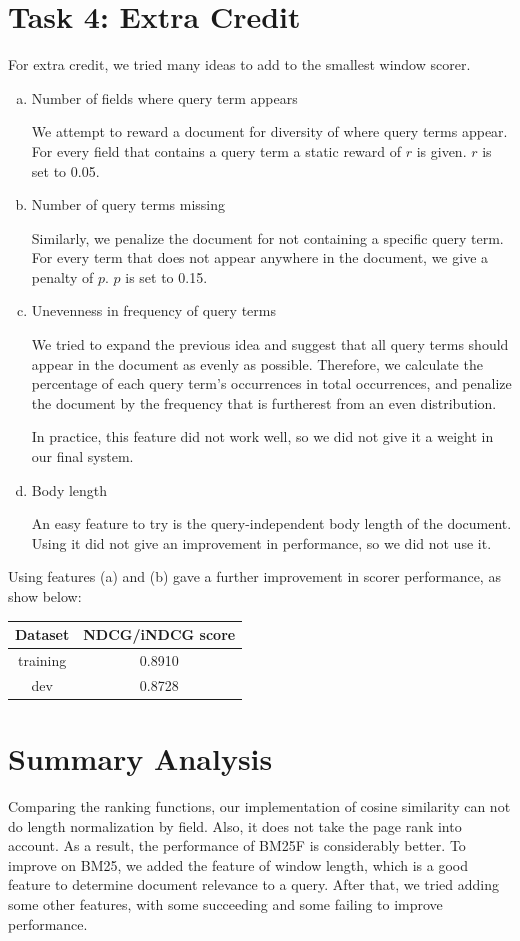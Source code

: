 \documentclass[10pt,twocolumn]{article}
\begin{document}
\section*{Task 4: Extra Credit}
For extra credit, we tried many ideas to add to the smallest window scorer.
\begin{enumerate}[(a)]
\item Number of fields where query term appears

We attempt to reward a document for diversity of where query terms appear. For every field that contains a query term a static reward of $r$ is given. $r$ is set to 0.05.
\item Number of query terms missing

Similarly, we penalize the document for not containing a specific query term. For every term that does not appear anywhere in the document, we give a penalty of $p$. $p$ is set to 0.15.
\item Unevenness in frequency of query terms

We tried to expand the previous idea and suggest that all query terms should appear in the document as evenly as possible. Therefore, we calculate the percentage of each query term's occurrences in total occurrences, and penalize the document by the frequency that is furtherest from an even distribution.

In practice, this feature did not work well, so we did not give it a weight in our final system.
\item Body length

An easy feature to try is the query-independent body length of the document. Using it did not give an improvement in performance, so we did not use it.
\end{enumerate}
Using features (a) and (b) gave a further improvement in scorer performance, as show below:
\begin{table}[H]
\centering
\begin{tabular}{|c|c|}
\hline
Dataset & NDCG/iNDCG score \\\hline
training & 0.8910\\\hline
dev & 0.8728\\\hline
\end{tabular}
\end{table}
\section*{Summary Analysis}
Comparing the ranking functions, our implementation of cosine similarity can not do length normalization by field. Also, it does not take the page rank into account. As a result, the performance of BM25F is considerably better. To improve on BM25, we added the feature of window length, which is a good feature to determine document relevance to a query. After that, we tried adding some other features, with some succeeding and some failing to improve performance. 
\end{document}
